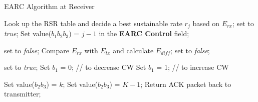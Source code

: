 \begin{algorithm}[!htb]
\small
\caption{EARC Algorithm at Receiver}
\begin{algorithmic}[1]
\STATE  Look up the RSR table and decide a best sustainable rate $r_{j}$ based on $E_{rx}$;
     set to {\it true};
    \STATE Set value($b_1$$b_2$$b_3$) = $j-1$ in the {\bf EARC Control} field;

    \ELSE
     set to {\it false};
    \STATE Compare $E_{rx}$ with $E_{tx}$ and calculate $E_{diff}$;
         set to {\it false};

        \ELSE
         set to {\it true};
            \STATE Set $b_1$ = 0; // to decrease CW
            \ELSE
            \STATE Set $b_1$ = 1; // to increase CW
            \ENDIF

            \STATE Set value($b_2$$b_3$) = $k$;
            \ELSE
            \STATE Set value($b_2$$b_3$) = $K-1$;
            \ENDIF
        \ENDIF
    \ENDIF
\STATE Return ACK packet back to transmitter;
\ENDWHILE
\end{algorithmic}\label{alg:EARC-rx}
\end{algorithm}

